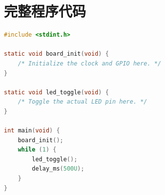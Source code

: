\documentclass[UTF8,zihao=-4,a4paper,oneside,fontset=fandol]{ctexart}
\begin{document}
\appendix
\section{完整程序代码}
\begin{lstlisting}[language=C,caption={完整程序结构示例}]
#include <stdint.h>

static void board_init(void) {
    /* Initialize the clock and GPIO here. */
}

static void led_toggle(void) {
    /* Toggle the actual LED pin here. */
}

int main(void) {
    board_init();
    while (1) {
        led_toggle();
        delay_ms(500U);
    }
}
\end{lstlisting}
\end{document}
